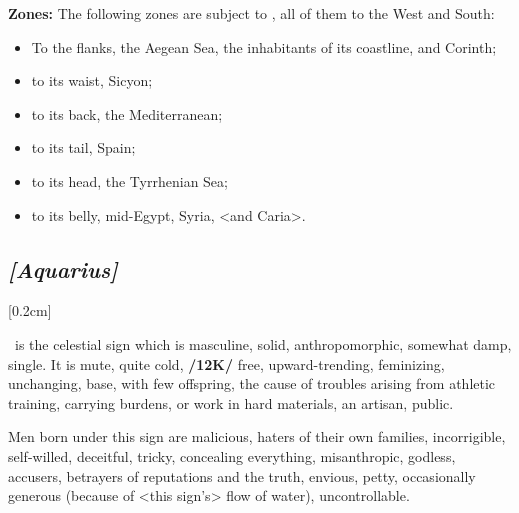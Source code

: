 \textbf{Zones:} The following zones are subject to \Capricorn, all of them to the West and South: 
\begin{itemize}
\item To the flanks, the Aegean Sea, the inhabitants of its coastline, and Corinth; 
\item to its waist, Sicyon; 
\item to its back, the Mediterranean; 
\item to its tail, Spain; 
\item to its head, the Tyrrhenian Sea; 
\item to its belly, mid-Egypt, Syria, <and Caria>.
\end{itemize}

\secbr
\subsection{\textit{[Aquarius]}}
[0.2cm]

 \Aquarius\, is the celestial sign which is  masculine,  solid,  anthropomorphic, somewhat damp, single. It is  mute, quite cold, \textbf{/12K/} free, upward-trending, feminizing, unchanging, base, with few offspring, the cause of troubles arising from athletic training, carrying burdens, or work in hard materials, an artisan, public. 

Men born under this sign are malicious, haters of their own families, incorrigible, self-willed, deceitful, tricky, concealing everything, misanthropic, godless, accusers, betrayers of reputations and the truth, envious, petty, occasionally generous (because of <this sign’s> flow of water), uncontrollable.

